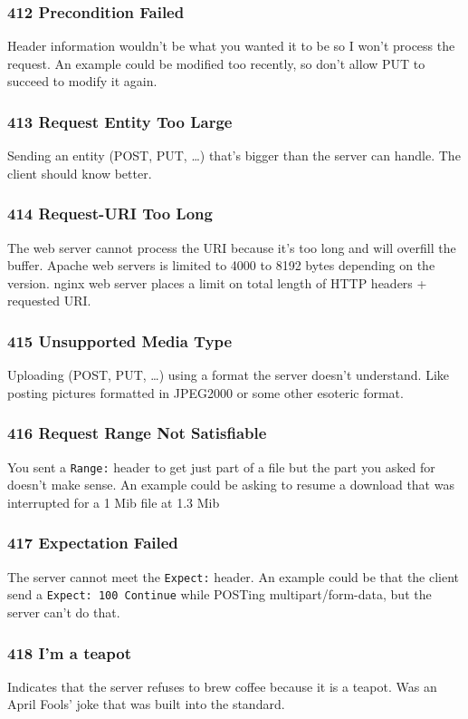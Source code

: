 \documentclass[../CMPUT-404-Notes.tex]{subfiles}
\begin{document}
\subsubsection{412 Precondition Failed}
Header information wouldn't be what you wanted it to be so I won't process the request.
An example could be modified too recently, so don't allow PUT to succeed to modify it again.

\subsubsection{413 Request Entity Too Large}
Sending an entity (POST, PUT, \ldots) that's bigger than the server can handle. 
The client should know better.

\subsubsection{414 Request-URI Too Long}
The web server cannot process the URI because it's too long and will overfill the buffer. 
Apache web servers is limited to 4000 to 8192 bytes depending on the version.
nginx web server  places a limit on total length of HTTP headers + requested URI.

\subsubsection{415 Unsupported Media Type}
Uploading (POST, PUT, \ldots) using a format the server doesn't understand. Like posting pictures formatted in JPEG2000 or some other esoteric format.

\subsubsection{416 Request Range Not Satisfiable}
You sent a \texttt{Range:} header to get just part of a file but the part you asked for doesn't make sense. 
An example could be asking to resume a download that was interrupted for a 1 Mib file at 1.3 Mib


\subsubsection{417 Expectation Failed}
The server cannot meet the \texttt{Expect:} header.
An example could be that the client send a \texttt{Expect: 100 Continue} while POSTing multipart/form-data, but the server can't do that.

\subsubsection{418 I'm a teapot}
Indicates that the server refuses to brew coffee because it is a teapot. Was an April Fools' joke that was built into the standard. 
\end{document}
